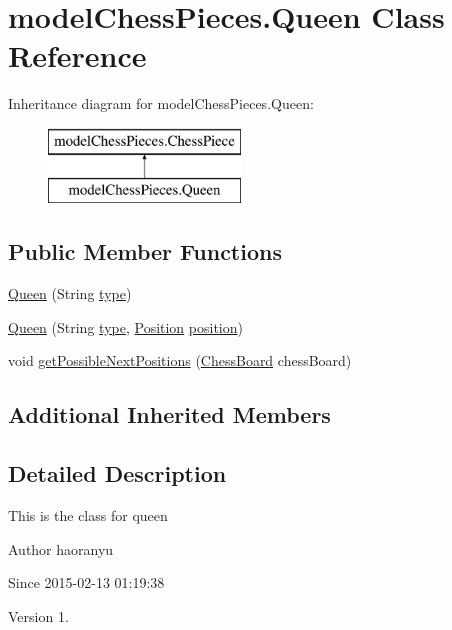 \hypertarget{classmodel_chess_pieces_1_1_queen}{\section{model\+Chess\+Pieces.\+Queen Class Reference}
\label{classmodel_chess_pieces_1_1_queen}
}
Inheritance diagram for model\+Chess\+Pieces.\+Queen\+:\begin{figure}[H]
\begin{center}
\leavevmode
\includegraphics[height=2.000000cm]{classmodel_chess_pieces_1_1_queen}
\end{center}
\end{figure}
\subsection*{Public Member Functions}
\begin{DoxyCompactItemize}
\item 
\hyperlink{classmodel_chess_pieces_1_1_queen_a7b704ff103b506b01303c9acfc777240}{Queen} (String \hyperlink{classmodel_chess_pieces_1_1_chess_piece_a195487ca88c197af7c1604247be31db2}{type})
\item 
\hyperlink{classmodel_chess_pieces_1_1_queen_a020aae1c181f51bf9a587c35ff7388c4}{Queen} (String \hyperlink{classmodel_chess_pieces_1_1_chess_piece_a195487ca88c197af7c1604247be31db2}{type}, \hyperlink{classmodel_core_1_1_position}{Position} \hyperlink{classmodel_chess_pieces_1_1_chess_piece_a3d4362d5b28f6edb14161196d9c6807d}{position})
\item 
void \hyperlink{classmodel_chess_pieces_1_1_queen_ab5c509d5eecc67d16fcde996a90f7099}{get\+Possible\+Next\+Positions} (\hyperlink{classmodel_core_1_1_chess_board}{Chess\+Board} chess\+Board)
\end{DoxyCompactItemize}
\subsection*{Additional Inherited Members}


\subsection{Detailed Description}
This is the class for queen \begin{DoxyAuthor}{Author}
haoranyu 
\end{DoxyAuthor}
\begin{DoxySince}{Since}
2015-\/02-\/13 01\+:19\+:38 
\end{DoxySince}
\begin{DoxyVersion}{Version}
1. 
\end{DoxyVersion}


